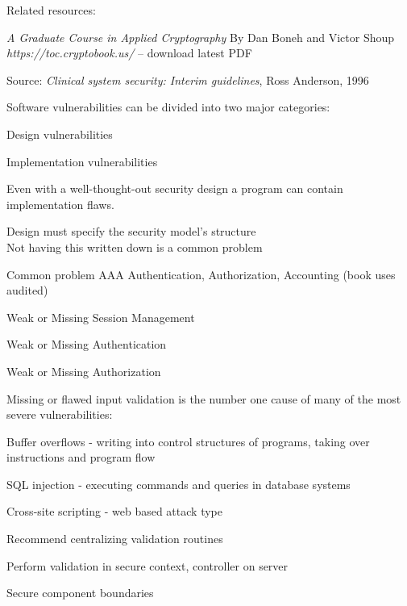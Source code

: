 \documentclass[Screen16to9,17pt]{foils}
\begin{document}
Related resources:
\begin{list1}
\item \emph{A Graduate Course in Applied Cryptography} By Dan Boneh and Victor Shoup \emph{https://toc.cryptobook.us/} -- download latest PDF
\end{list1}





Source:
\emph{Clinical system security: Interim guidelines}, Ross Anderson, 1996



Software vulnerabilities can be divided into two major categories:
\begin{list2}
\item Design vulnerabilities
\item Implementation vulnerabilities
\end{list2}

Even with a well-thought-out security design a program can contain implementation flaws.


\begin{list2}
\item Design must specify the security model's structure\\
Not having this written down is a common problem
\item Common problem AAA Authentication, Authorization, Accounting (book uses audited)
\item Weak or Missing Session Management
\item Weak or Missing Authentication
\item Weak or Missing Authorization
\end{list2}



Missing or flawed input validation is the number one cause of many of the most severe vulnerabilities:
\begin{list2}
\item Buffer overflows - writing into control structures of programs, taking over instructions and program flow
\item SQL injection - executing commands and queries in database systems
\item Cross-site scripting - web based attack type
\item Recommend centralizing validation routines
\item Perform validation in secure context, controller on server
\item Secure component boundaries
\end{list2}
\end{document}
